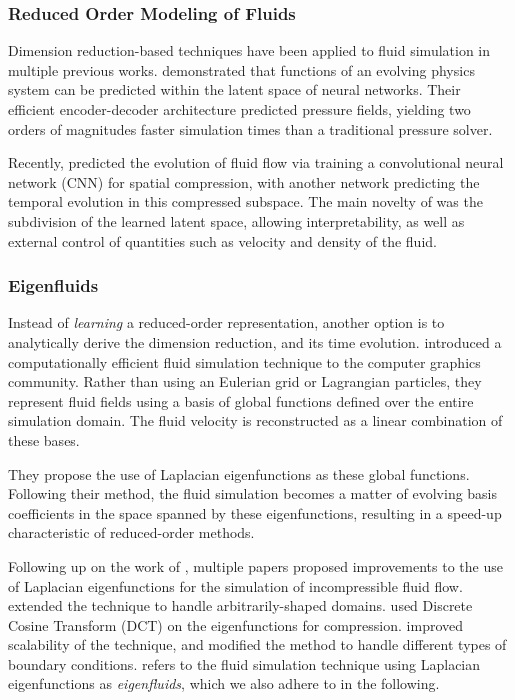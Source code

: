 \subsubsection*{Reduced Order Modeling of Fluids}
Dimension reduction-based techniques have been applied to fluid simulation in
multiple previous works. \cite{Wiewel2019LatentSP} demonstrated that functions
of an evolving physics system can be predicted within the latent space of neural
networks. Their efficient encoder-decoder architecture predicted pressure
fields, yielding two orders of magnitudes faster simulation times than
a traditional pressure solver.

Recently, \cite{LatentSpaceSubdivision} predicted the
evolution of fluid flow via training a convolutional neural network (CNN) for
spatial compression, with another network predicting the temporal evolution in
this compressed subspace.  The main novelty of \cite{LatentSpaceSubdivision} was
the subdivision of the learned latent space, allowing interpretability, as well
as external control of quantities such as velocity and density of the fluid.

\subsubsection*{Eigenfluids}
Instead of \textit{learning} a reduced-order representation, another option is
to analytically derive the dimension reduction, and its time evolution.
\cite{dewitt} introduced a computationally efficient fluid simulation technique
to the computer graphics community. Rather than using an Eulerian grid or
Lagrangian particles, they represent fluid fields using a basis of global
functions defined over the entire simulation domain. The fluid velocity is
reconstructed as a linear combination of these bases.

They propose the use of Laplacian eigenfunctions as these global functions.
Following their method, the fluid simulation becomes a matter of evolving basis
coefficients in the space spanned by these eigenfunctions, resulting in
a speed-up characteristic of reduced-order methods. 

Following up on the work of \cite{dewitt}, multiple papers proposed improvements
to the use of Laplacian eigenfunctions for the simulation of incompressible
fluid flow. \cite{ModelReductionFluidSim} extended the technique to handle
arbitrarily-shaped domains. \cite{EigenfluidCompression} used Discrete Cosine
Transform (DCT) on the eigenfunctions for compression.
\cite{scalable-eigenfluids} improved scalability of the technique, and modified
the method to handle different types of boundary conditions.
\cite{scalable-eigenfluids} refers to the fluid simulation technique using
Laplacian eigenfunctions as \textit{eigenfluids}, which we also adhere to in the
following.

